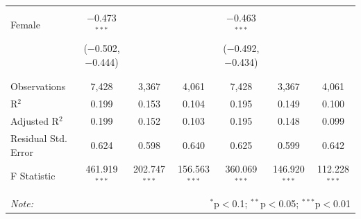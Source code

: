 \documentclass[12pt,a4paper]{article}
\numberwithin{equation}{section}
\begin{document}
\begin{landscape}
\begin{table}[!htbp]
\begin{tabular}{@{\extracolsep{5pt}}lcccccc}
			& & & & & & \\ 
			Female & $-$0.473$^{***}$ &  &  & $-$0.463$^{***}$ &  &  \\ 
			& ($-$0.502, $-$0.444) &  &  & ($-$0.492, $-$0.434) &  &  \\ 
			& & & & & & \\ 
			\hline \\[-1.8ex] 
			Observations & 7,428 & 3,367 & 4,061 & 7,428 & 3,367 & 4,061 \\ 
			R$^{2}$ & 0.199 & 0.153 & 0.104 & 0.195 & 0.149 & 0.100 \\ 
			Adjusted R$^{2}$ & 0.199 & 0.152 & 0.103 & 0.195 & 0.148 & 0.099 \\ 
			Residual Std. Error & 0.624 & 0.598 & 0.640 & 0.625 & 0.599 & 0.642 \\ 
			F Statistic & 461.919$^{***}$ & 202.747$^{***}$ & 156.563$^{***}$ & 360.069$^{***}$ & 146.920$^{***}$ & 112.228$^{***}$ \\ 
			\hline 
			\hline \\[-1.8ex] 
			\textit{Note:}  & \multicolumn{6}{r}{$^{*}$p$<$0.1; $^{**}$p$<$0.05; $^{***}$p$<$0.01} \\ 
		\end{tabular} 
	\end{table} 
	
\end{landscape}

\newpage
\end{document}
